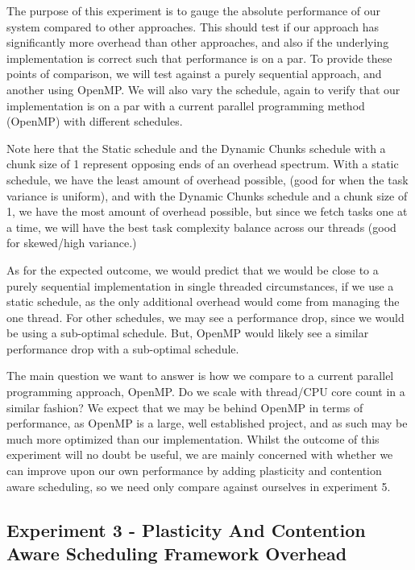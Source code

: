 The purpose of this experiment is to gauge the absolute performance of our system compared to other approaches. This should test if our approach has significantly more overhead than other approaches, and also if the underlying implementation is correct such that performance is on a par. To provide these points of comparison, we will test against a purely sequential approach, and another using OpenMP. We will also vary the schedule, again to verify that our implementation is on a par with a current parallel programming method (OpenMP) with different schedules.

Note here that the Static schedule and the Dynamic Chunks schedule with a chunk size of 1 represent opposing ends of an overhead spectrum. With a static schedule, we have the least amount of overhead possible, (good for when the task variance is uniform), and with the Dynamic Chunks schedule and a chunk size of 1, we have the most amount of overhead possible, but since we fetch tasks one at a time, we will have the best task complexity balance across our threads (good for skewed/high variance.)

As for the expected outcome, we would predict that we would be close to a purely sequential implementation in single threaded circumstances, if we use a static schedule, as the only additional overhead would come from managing the one thread. For other schedules, we may see a performance drop, since we would be using a sub-optimal schedule. But, OpenMP would likely see a similar performance drop with a sub-optimal schedule.

The main question we want to answer is how we compare to a current parallel programming approach, OpenMP. Do we scale with thread/CPU core count in a similar fashion? We expect that we may be behind OpenMP in terms of performance, as OpenMP is a large, well established project, and as such may be much more optimized than our implementation. Whilst the outcome of this experiment will no doubt be useful, we are mainly concerned with whether we can improve upon our own performance by adding plasticity and contention aware scheduling, so we need only compare against ourselves in experiment 5.





\subsection{Experiment 3 - Plasticity And Contention Aware Scheduling Framework Overhead}

